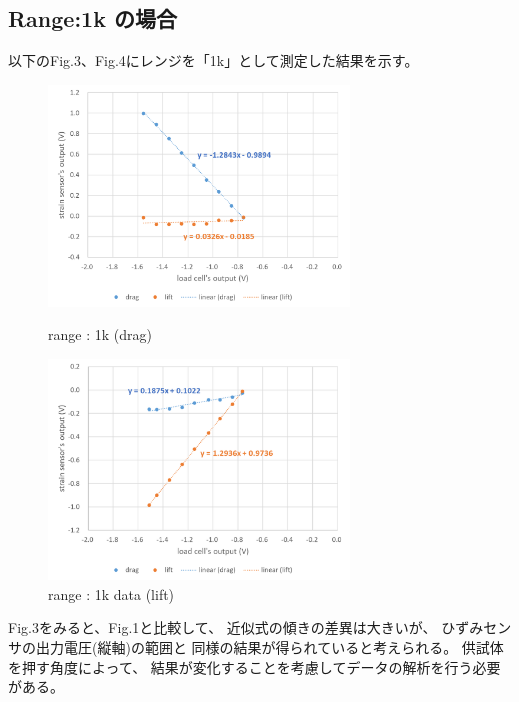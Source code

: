 \documentclass[twocolumn,a4j]{jsarticle}
\begin{document}
\subsection{Range:1k の場合}
以下のFig.3、Fig.4にレンジを「1k」として測定した結果を示す。
\begin{figure}[htbp]
    \footnotesize
    \begin{center}
        \includegraphics[width=80mm]{../images/1k_drag.png}
        \caption{range : 1k (drag)}
        \includegraphics[width=80mm]{../images/1k_lift.png}
        \caption{range : 1k data (lift)}
    \end{center}
\end{figure}\par
Fig.3をみると、Fig.1と比較して、
近似式の傾きの差異は大きいが、
ひずみセンサの出力電圧(縦軸)の範囲と
同様の結果が得られていると考えられる。
供試体を押す角度によって、
結果が変化することを考慮してデータの解析を行う必要がある。
\newpage
\end{document}
